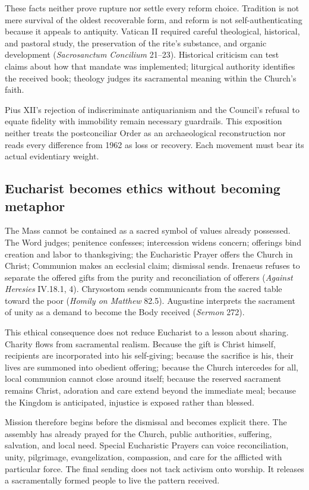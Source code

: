 These facts neither prove rupture nor settle every reform choice. Tradition is not mere survival of the oldest recoverable form, and reform is not self-authenticating because it appeals to antiquity. Vatican II required careful theological, historical, and pastoral study, the preservation of the rite's substance, and organic development (\emph{Sacrosanctum Concilium} 21--23). Historical criticism can test claims about how that mandate was implemented; liturgical authority identifies the received book; theology judges its sacramental meaning within the Church's faith.

Pius XII's rejection of indiscriminate antiquarianism and the Council's refusal to equate fidelity with immobility remain necessary guardrails. This exposition neither treats the postconciliar Order as an archaeological reconstruction nor reads every difference from 1962 as loss or recovery. Each movement must bear its actual evidentiary weight.

\subsection{Eucharist becomes ethics without becoming metaphor}

The Mass cannot be contained as a sacred symbol of values already possessed. The Word judges; penitence confesses; intercession widens concern; offerings bind creation and labor to thanksgiving; the Eucharistic Prayer offers the Church in Christ; Communion makes an ecclesial claim; dismissal sends. Irenaeus refuses to separate the offered gifts from the purity and reconciliation of offerers (\emph{Against Heresies} IV.18.1, 4). Chrysostom sends communicants from the sacred table toward the poor (\emph{Homily on Matthew} 82.5). Augustine interprets the sacrament of unity as a demand to become the Body received (\emph{Sermon} 272).

This ethical consequence does not reduce Eucharist to a lesson about sharing. Charity flows from sacramental realism. Because the gift is Christ himself, recipients are incorporated into his self-giving; because the sacrifice is his, their lives are summoned into obedient offering; because the Church intercedes for all, local communion cannot close around itself; because the reserved sacrament remains Christ, adoration and care extend beyond the immediate meal; because the Kingdom is anticipated, injustice is exposed rather than blessed.

Mission therefore begins before the dismissal and becomes explicit there. The assembly has already prayed for the Church, public authorities, suffering, salvation, and local need. Special Eucharistic Prayers can voice reconciliation, unity, pilgrimage, evangelization, compassion, and care for the afflicted with particular force. The final sending does not tack activism onto worship. It releases a sacramentally formed people to live the pattern received.

